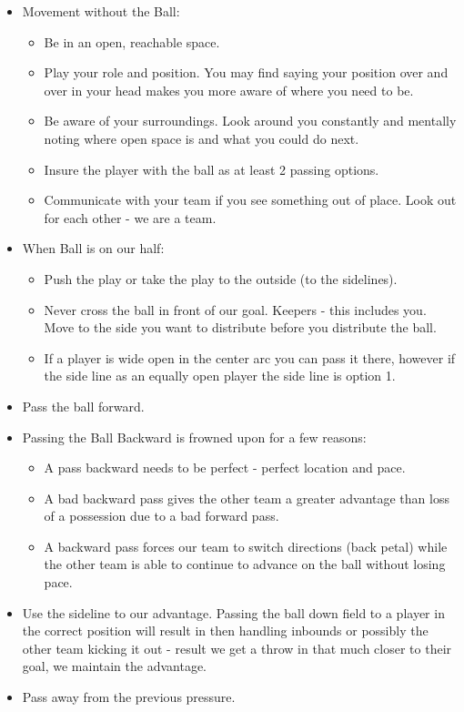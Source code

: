 \documentclass[10pt,letterpaper]{article}
\newenvironment{oddBlock}[1]{%
    \tcolorbox[beamer,%
    noparskip,breakable,
    colback=LightBlue,colframe=DarkBlue,%
    colbacklower=DarkBlue!75!LightBlue,%
    title=#1]}%
    {\endtcolorbox}
\begin{document}
\begin{oddBlock}{Basic Tactics}
    \begin{itemize}
        \item Movement without the Ball:
        \begin{itemize}
            \item Be in an open, reachable space.
            \item Play your role and position.  You may find saying your position over and over in your head makes you more aware of where you need to be.
            \item Be aware of your surroundings. Look around you constantly and mentally noting where open space is and what you could do next.
            \item Insure the player with the ball as at least 2 passing options.
            \item Communicate with your team if you see something out of place.  Look out for each other - we are a team.
        \end{itemize}
        \item When Ball is on our half:
        \begin{itemize}
            \item Push the play or take the play to the outside (to the sidelines).
            \item Never cross the ball in front of our goal.  Keepers - this includes you.  Move to the side you want to distribute before you distribute the ball.
            \item If a player is wide open in the center arc you can pass it there, however if the side line as an equally open player the side line is option 1.
        \end{itemize}
        \item Pass the ball forward.
        \item Passing the Ball Backward is frowned upon for a few reasons:
        \begin{itemize}
            \item A pass backward needs to be perfect - perfect location and pace.
            \item A bad backward pass gives the other team a greater advantage than loss of a possession due to a bad forward pass.
            \item A backward pass forces our team to switch directions (back petal) while the other team is able to continue to advance on the ball without losing pace.
        \end{itemize}
        \item Use the sideline to our advantage. Passing the ball down field to a player in the correct position will result in then handling inbounds or possibly the other team kicking it out - result we get a throw in that much closer to their goal, we maintain the advantage.
        \item Pass away from the previous pressure.
    \end{itemize}
\end{oddBlock}
\end{document}
